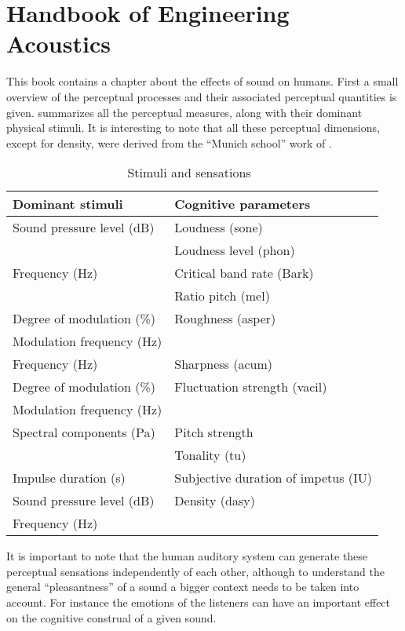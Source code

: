 \documentclass%
  [/Users/rodrigo/Documents/TUe/thesis/latex/topic/fluctuation_strength/
  literature_review.tex]
  {subfiles}
\begin{document}
\section{Handbook of Engineering Acoustics}

This book contains a chapter about the effects of sound on humans. First a small
overview of the perceptual processes and their associated perceptual quantities
is given.  summarizes all the perceptual measures, along with
their dominant physical stimuli. It is interesting to note that all these
perceptual dimensions, except for density, were derived from the
``Munich school'' work of \citeauthor{Fastl2007Psychoacoustics}.

\begin{table}[ht]
  \centering
  \begin{tabular}{ l l }
    \toprule
    \textbf{Dominant stimuli} & \textbf{Cognitive parameters} \\
    \midrule
    Sound pressure level (dB) & Loudness (sone) \\
    \cmidrule{2-2}
    & Loudness level (phon) \\
    \midrule
    Frequency (Hz) & Critical band rate (Bark) \\
    \cmidrule{2-2}
    & Ratio pitch (mel) \\
    \midrule
    Degree of modulation (\%) & Roughness (asper)\\
    \cmidrule{1-1}
    Modulation frequency (Hz) & \\
    \midrule
    Frequency (Hz) & Sharpness (acum) \\
    \midrule
    Degree of modulation (\%) & Fluctuation strength (vacil) \\
    \cmidrule{1-1}
    Modulation frequency (Hz) & \\
    \midrule
    Spectral components (Pa) & Pitch strength \\
    \cmidrule{2-2}
    & Tonality (tu) \\
    \midrule
    Impulse duration (s) & Subjective duration of impetus (IU) \\
    \midrule
    Sound pressure level (dB) & Density (dasy) \\
    Frequency (Hz) & \\
    \bottomrule
  \end{tabular}
  \caption{Stimuli and sensations~\cite[pp.~70]{Mueller2012Handbook}}
\label{tab:stimsens}
\end{table}

It is important to note that the human auditory system can generate these
perceptual sensations independently of each other, although to understand the
general ``pleasantness'' of a sound a bigger context needs to be taken into
account. For instance the emotions of the listeners can have an important
effect on the cognitive construal of a given sound.
\end{document}
